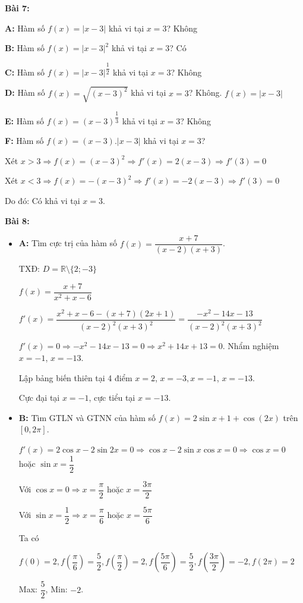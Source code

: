 \documentclass[12pt,a4paper]{article}
\begin{document}
\textbf{Bài 7:}

\textbf{A:} Hàm số $f(x) = |x - 3|$ khả vi tại $x = 3$? Không

\textbf{B:} Hàm số $f(x) = |x - 3|^2$ khả vi tại $x = 3$? Có

\textbf{C:} Hàm số $f(x) = |x - 3|^{\dfrac{1}{2}}$ khả vi tại $x = 3$? Không

\textbf{D:} Hàm số $f(x) = \sqrt{(x - 3)^2}$ khả vi tại $x = 3$? Không. $f(x) = |x - 3|$

\textbf{E:} Hàm số $f(x) = (x - 3)^{\dfrac{1}{3}}$ khả vi tại $x = 3$? Không

\textbf{F:} Hàm số $f(x) = (x - 3).|x - 3|$ khả vi tại $x = 3$?

Xét $x > 3 \Rightarrow f(x) = (x - 3)^2 \Rightarrow f'(x) = 2(x - 3) \Rightarrow f'(3) = 0$

Xét $x < 3 \Rightarrow f(x) = -(x - 3)^2 \Rightarrow f'(x) = -2(x - 3) \Rightarrow f'(3) = 0$

Do đó: Có khả vi tại $x = 3$.

\textbf{Bài 8:}

\begin{itemize}
    \item \textbf{A:} Tìm cực trị của hàm số $f(x)=\dfrac{x+7}{(x-2)(x+3)}$.

    TXĐ: $D = \mathbb{R}\setminus \{2;-3\}$

    $f(x) = \dfrac{x + 7}{x^2 + x - 6}$

    $f'(x) = \dfrac{x^2 + x - 6 - (x + 7)(2x + 1)}{(x - 2)^2(x + 3)^2} = \dfrac{-x^2 - 14x - 13}{(x - 2)^2(x + 3)^2}$

    $f'(x) = 0 \Rightarrow -x^2 - 14x - 13 = 0 \Rightarrow x^2 + 14x + 13 = 0$. Nhẩm nghiệm $x = -1$, $x = -13$.

    Lập bảng biến thiên tại 4 điểm $x = 2$, $x = -3, x = -1$, $x = -13$.
    
    Cực đại tại $x=-1$, cực tiểu tại $x=-13$.
    \item \textbf{B:} Tìm GTLN và GTNN của hàm số $f(x)=2\sin x+1+\cos(2x)$ trên $[0,2\pi]$.

    $f'(x) = 2\cos x - 2\sin 2x = 0 \Rightarrow \cos x - 2\sin x \cos x = 0 \Rightarrow \cos x = 0$ hoặc $\sin x = \dfrac{1}{2}$

    Với $\cos x = 0 \Rightarrow x = \dfrac{\pi}{2}$ hoặc $x = \dfrac{3\pi}{2}$

    Với $\sin x = \dfrac{1}{2} \Rightarrow x = \dfrac{\pi}{6}$ hoặc $x = \dfrac{5\pi}{6}$

    Ta có

    $f(0) = 2, f(\dfrac{\pi}{6}) = \dfrac{5}{2}, f(\dfrac{\pi}{2}) = 2, f(\dfrac{5\pi}{6}) = \dfrac{5}{2}, f(\dfrac{3\pi}{2}) = -2, f(2\pi) = 2$
    
    Max: $\dfrac{5}{2}$, Min: $-2$.
\end{itemize}
\end{document}
